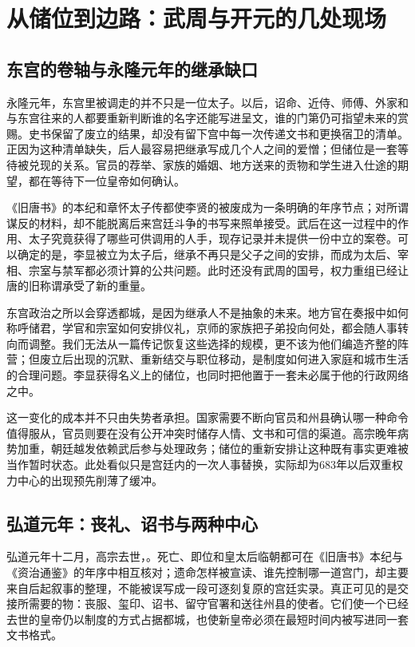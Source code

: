 \section{从储位到边路：武周与开元的几处现场}

\subsection{东宫的卷轴与永隆元年的继承缺口}
永隆元年，东宫里被调走的并不只是一位太子。以后，诏命、近侍、师傅、外家和与东宫往来的人都要重新判断谁的名字还能写进呈文，谁的门第仍可指望未来的赏赐。史书保留了废立的结果，却没有留下宫中每一次传递文书和更换宿卫的清单。正因为这种清单缺失，后人最容易把继承写成几个人之间的爱憎；但储位是一套等待被兑现的关系。官员的荐举、家族的婚姻、地方送来的贡物和学生进入仕途的期望，都在等待下一位皇帝如何确认。

《旧唐书》的本纪和章怀太子传都使李贤的被废成为一条明确的年序节点；对所谓谋反的材料，却不能脱离后来宫廷斗争的书写来照单接受。武后在这一过程中的作用、太子究竟获得了哪些可供调用的人手，现存记录并未提供一份中立的案卷。可以确定的是，李显被立为太子后，继承不再只是父子之间的安排，而成为太后、宰相、宗室与禁军都必须计算的公共问题。此时还没有武周的国号，权力重组已经让唐的旧称谓承受了新的重量。

东宫政治之所以会穿透都城，是因为继承人不是抽象的未来。地方官在奏报中如何称呼储君，学官和宗室如何安排仪礼，京师的家族把子弟投向何处，都会随人事转向而调整。我们无法从一篇传记恢复这些选择的规模，更不该为他们编造齐整的阵营；但废立后出现的沉默、重新结交与职位移动，是制度如何进入家庭和城市生活的合理问题。李显获得名义上的储位，也同时把他置于一套未必属于他的行政网络之中。

这一变化的成本并不只由失势者承担。国家需要不断向官员和州县确认哪一种命令值得服从，官员则要在没有公开冲突时储存人情、文书和可信的渠道。高宗晚年病势加重，朝廷越发依赖武后参与处理政务；储位的重新安排让这种既有事实更难被当作暂时状态。此处看似只是宫廷内的一次人事替换，实际却为683年以后双重权力中心的出现预先削薄了缓冲。

\subsection{弘道元年：丧礼、诏书与两种中心}
弘道元年十二月，高宗去世，。死亡、即位和皇太后临朝都可在《旧唐书》本纪与《资治通鉴》的年序中相互核对；遗命怎样被宣读、谁先控制哪一道宫门，却主要来自后起叙事的整理，不能被误写成一段可逐刻复原的宫廷实录。真正可见的是交接所需要的物：丧服、玺印、诏书、留守官署和送往州县的使者。它们使一个已经去世的皇帝仍以制度的方式占据都城，也使新皇帝必须在最短时间内被写进同一套文书格式。


